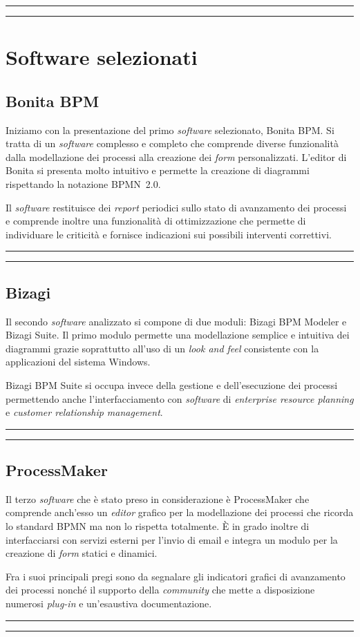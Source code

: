 \documentclass[a4paper,10pt]{article}
\newcommand{\inglese}[1]{\foreignlanguage{english}{\textit{#1}}}
\newcommand{\sw}{\inglese{software}\xspace}
\newcommand{\cambioslide}{%
\begin{center}
\Large
\rule[4pt]{0.2\linewidth}{.7pt} \ding{167} \rule[4pt]{0.2\linewidth}{.7pt}
\end{center}
}
\begin{document}
\cambioslide

\section{Software selezionati}

\subsection{Bonita BPM}
Iniziamo con la presentazione del primo \sw selezionato, Bonita BPM. Si tratta di un \sw complesso e completo che comprende diverse funzionalità dalla modellazione dei processi alla creazione dei \inglese{form} personalizzati.
L'editor di Bonita si presenta molto intuitivo e permette la creazione di diagrammi rispettando la notazione BPMN~2.0.

Il \sw restituisce dei \inglese{report} periodici sullo stato di avanzamento dei processi e comprende inoltre una funzionalità di ottimizzazione che permette di individuare le criticità e fornisce indicazioni sui possibili interventi correttivi.

\cambioslide

\subsection{Bizagi}
Il secondo \sw analizzato si compone di due moduli: Bizagi BPM Modeler e Bizagi Suite. Il primo modulo permette una modellazione semplice e intuitiva dei diagrammi grazie soprattutto all'uso di un \inglese{look and feel} consistente con la applicazioni del sistema Windows.

Bizagi BPM Suite si occupa invece della gestione e dell'esecuzione dei processi permettendo anche l'interfacciamento con \sw di \inglese{enterprise resource planning} e \inglese{customer relationship management}.

\cambioslide

\subsection{ProcessMaker}
Il terzo \sw che è stato preso in considerazione è ProcessMaker che comprende anch'esso un \inglese{editor} grafico per la modellazione dei processi che ricorda lo standard BPMN ma non lo rispetta totalmente. È in grado inoltre di interfacciarsi con servizi esterni per l'invio di email e integra un modulo per la creazione di \inglese{form} statici e dinamici.

Fra i suoi principali pregi sono da segnalare gli indicatori grafici di avanzamento dei processi nonché il supporto della \inglese{community} che mette a disposizione numerosi \inglese{plug-in} e un'esaustiva documentazione.
\cambioslide
\end{document}
